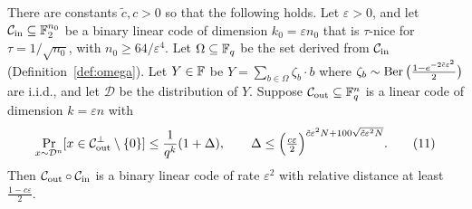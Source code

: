 \begin{theorem}
  \label{thm:soft-decoding}
  There are constants $\tilde c, c > 0$ so that the following holds. Let
  $\varepsilon > 0$, and let $\mathcal{C}_{\mathrm{in}} \subseteq \mathbb{F}_2^{n_0}$ be a binary linear code
  of dimension $k_0 = \varepsilon n_0$ that is $\tau$-nice for
  $\tau = 1/\sqrt{n_0}$, with $n_0 \geq 64/\varepsilon^4$. Let $\Omega \subseteq
  \mathbb{F}_q$ be the set derived from $\mathcal{C}_{\mathrm{in}}$ (Definition~\ref{def:omega}). Let
  $Y \in \mathbb{F}$ be $Y = \sum_{b\in\Omega}\zeta_b\cdot b$ where
  $\zeta_b \sim \operatorname{Ber}\big(\frac{1-e^{-2\tilde c\varepsilon^2}}{2}\big)$ are i.i.d.,
  and let $\mathcal{D}$ be the distribution of $Y$. Suppose
  $\mathcal{C}_{\mathrm{out}} \subseteq \mathbb{F}_q^n$ is a linear code of dimension $k = \varepsilon n$ with
  \begin{equation}
    \Pr_{x\sim\mathcal{D}^n}[x \in \mathcal{C}_{\mathrm{out}}^\perp\setminus\{0\}]
      \leq \frac{1}{q^k}(1 + \Delta),\qquad
    \Delta \leq \Big(\tfrac{c\varepsilon}{2}\Big)^{\tilde c\varepsilon^2 N
      + 100\sqrt{\tilde c\varepsilon^2 N}}.
    \tag{11}
  \end{equation}
  Then $\mathcal{C}_{\mathrm{out}} \circ \mathcal{C}_{\mathrm{in}}$ is a binary linear code of rate $\varepsilon^2$ with
  relative distance at least $\frac{1-c\varepsilon}{2}$.
\end{theorem}
